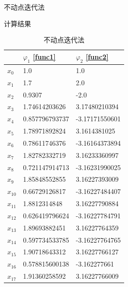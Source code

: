 \documentclass[a4paper]{article}
\begin{document}
\begin{multicols}{2}
\begin{section}{不动点迭代法}
\begin{subsection}{计算结果}
		\begin{table}[H]
		\caption{不动点迭代法}
		\centering
		\label{table_fp}
		\begin{tabular}{l|l|l}
		\hline
		       & $\varphi_1$ \ref{func1} & $\varphi_2$ \ref{func2} \\ \hline
		$x_0$  & 1.0                            & 1.0                            \\
		$x_1$  & 1.7                            & 2.0                            \\
		$x_2$  & 0.9307                         & -2.0                           \\
		$x_3$  & 1.74614203626                  & 3.17480210394                  \\
		$x_4$  & 0.857796793737                 & -3.17171550601                 \\
		$x_5$  & 1.78971892824                  & 3.1614381025                   \\
		$x_6$  & 0.78611746376                  & -3.16164373894                 \\
		$x_7$  & 1.82782332719                  & 3.16233360997                  \\
		$x_8$  & 0.721147914713                 & -3.16231990025                 \\
		$x_9$  & 1.85848552855                  & 3.16227393009                  \\
		$x_{10}$ & 0.66729126817                  & -3.16227484407                 \\
		$x_{11}$ & 1.8812314848                   & 3.16227790884                  \\
		$x_{12}$ & 0.626419796624                 & -3.16227784791                 \\
		$x_{13}$ & 1.89693882451                  & 3.16227764359                  \\
		$x_{14}$ & 0.597734533785                 & -3.16227764765                 \\
		$x_{15}$ & 1.90718643312                  & 3.16227766127                  \\
		$x_{16}$ & 0.578815600138                 & -3.162277661                   \\
		$x_{17}$ & 1.91360258592                  & 3.16227766009                  \\ \hline
		\end{tabular}
		\end{table}
		

\end{subsection}
\end{section}
\end{multicols}
\end{document}
